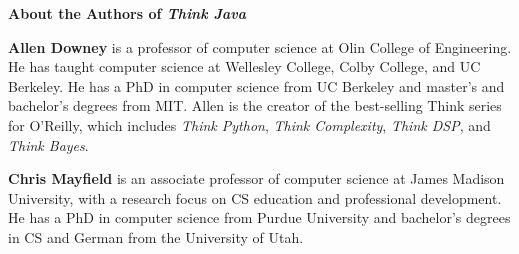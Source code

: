 \documentclass[12pt]{book}
\theoremstyle{exercise}
\begin{document}
{\bf\huge About the Authors of {\em Think Java}}

{\bf Allen Downey} is a professor of computer science at Olin College of Engineering.
He has taught computer science at Wellesley College, Colby College, and UC Berkeley.
He has a PhD in computer science from UC Berkeley and master's and bachelor's degrees from MIT.
Allen is the creator of the best-selling Think series for O'Reilly, which includes {\it Think Python}, {\it Think Complexity}, {\it Think DSP}, and {\it Think Bayes}.

{\bf Chris Mayfield} is an associate professor of computer science at James Madison University, with a research focus on CS education and professional development.
He has a PhD in computer science from Purdue University and bachelor's degrees in CS and German from the University of Utah.

\fi
\end{document}
